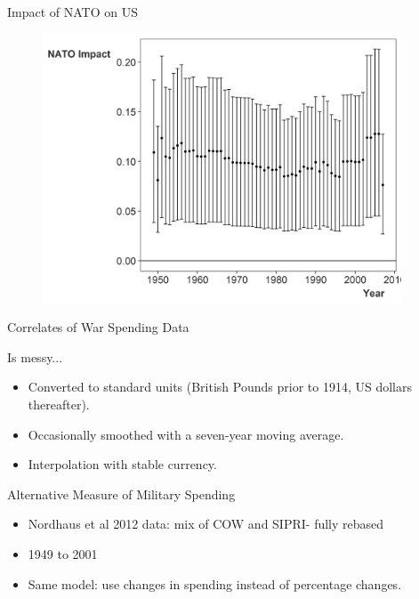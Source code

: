 \documentclass[12pt]{beamer}
\begin{document}

\begin{frame}{Impact of NATO on US}


\begin{figure}
	\centering
		\includegraphics[width=0.95\textwidth]{nato-imp-us.png}
\end{figure}


\end{frame}



\begin{frame}{Correlates of War Spending Data}

Is messy... 

\begin{itemize}
\item Converted to standard units (British Pounds prior to 1914, US dollars thereafter). 
\item Occasionally smoothed with a seven-year moving average.
\item Interpolation with stable currency.
\end{itemize} 


\end{frame}



\begin{frame}{Alternative Measure of Military Spending}


\begin{itemize} 
\item Nordhaus et al 2012 data: mix of COW and SIPRI- fully rebased
\item 1949 to 2001
\item Same model: use changes in spending instead of percentage changes. 
\end{itemize}

\end{frame}
\end{document}
